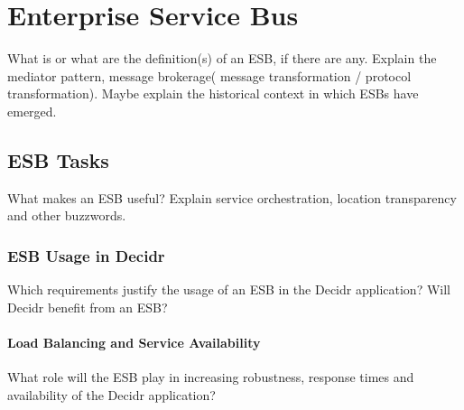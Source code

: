 %
%




\chapter{Enterprise Service Bus}
\label{chap:enterprise-service-bus}

What is or what are the definition(s) of an ESB, if there are any. Explain the
mediator pattern, message brokerage( message transformation / protocol
transformation). Maybe explain the historical context in which ESBs have
emerged.

\section{ESB Tasks}
\label{sec:esb-tasks}
What makes an ESB useful? Explain service orchestration, location transparency
and other buzzwords.

\subsection{ESB Usage in Decidr}
\label{subsec:esb-usage-in-decidr}
Which requirements justify the usage of an ESB in the Decidr application? 
Will Decidr benefit from an ESB?

\subsubsection{Load Balancing and Service Availability}
\label{subsubsec:load-balancing-and-service-availability}
What role will the ESB play in increasing robustness, response times and
availability of the Decidr application?


